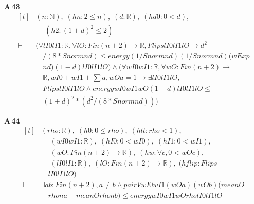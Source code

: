 \noindent\textbf{A\,43}\quad{}
{\footnotesize\[ \begin{aligned}[t]
&(\mathit{n} : \mathbb{N} ),\; (\mathit{hn} : 2 \leq \mathit{n}),\; (\mathit{d} : \mathbb{R} ),\; (\mathit{hd0} : 0 < \mathit{d}),\\
&\quad \; (\mathit{h2} : (1+\mathit{d})^{2} \leq 2)\\
\vdash\;&(\forall \mathit{lI0} \mathit{lI1} : \mathbb{R} , \forall \mathit{lO} : \mathit{Fin} (\mathit{n}+2) \to \mathbb{R} , \mathit{Flips} \mathit{lI0} \mathit{lI1} \mathit{lO} \to \mathit{d}^{2}\\
&\quad /(8*\mathit{Snorm} \mathit{n} \mathit{d}) \leq \mathit{energy} (1/\mathit{Snorm} \mathit{n} \mathit{d}) (1/\mathit{Snorm} \mathit{n} \mathit{d}) (\mathit{wExp}\\
&\quad \mathit{n} \mathit{d}) (1-\mathit{d}) \mathit{lI0} \mathit{lI1} \mathit{lO}) \wedge (\forall \mathit{wI0} \mathit{wI1} : \mathbb{R} , \forall \mathit{wO} : \mathit{Fin} (\mathit{n}+2) \to\\
&\quad \mathbb{R} , \mathit{wI0} + \mathit{wI1} + \textstyle\sum \mathit{a}, \mathit{wO} \mathit{a} = 1 \to \exists \mathit{lI0} \mathit{lI1} \mathit{lO},\\
&\quad \mathit{Flips} \mathit{lI0} \mathit{lI1} \mathit{lO} \wedge \mathit{energy} \mathit{wI0} \mathit{wI1} \mathit{wO} (1-\mathit{d}) \mathit{lI0} \mathit{lI1} \mathit{lO} \leq\\
&\quad (1+\mathit{d})^{2}*(\mathit{d}^{2}/(8*\mathit{Snorm} \mathit{n} \mathit{d})))
\end{aligned} \]}

\noindent\textbf{A\,44}\quad{}
{\footnotesize\[ \begin{aligned}[t]
&(\mathit{rho} : \mathbb{R} ),\; (\mathit{h0} : 0 \leq \mathit{rho}),\; (\mathit{hlt} : \mathit{rho} < 1),\\
&\quad \; (\mathit{wI0} \mathit{wI1} : \mathbb{R} ),\; (\mathit{hI0} : 0 < \mathit{wI0}),\; (\mathit{hI1} : 0 < \mathit{wI1}),\\
&\quad \; (\mathit{wO} : \mathit{Fin} (\mathit{n}+2) \to \mathbb{R} ),\; (\mathit{hw} : \forall \mathit{c}, 0 < \mathit{wO} \mathit{c}),\\
&\quad \; (\mathit{lI0} \mathit{lI1} : \mathbb{R} ),\; (\mathit{lO} : \mathit{Fin} (\mathit{n}+2) \to \mathbb{R} ),\; (\mathit{hflip} : \mathit{Flips}\\
&\quad \mathit{lI0} \mathit{lI1} \mathit{lO})\\
\vdash\;&\exists \mathit{a} \mathit{b} : \mathit{Fin} (\mathit{n}+2), \mathit{a} \neq \mathit{b} \wedge \mathit{pairV} \mathit{wI0} \mathit{wI1} (\mathit{wO} \mathit{a}) (\mathit{wO} \mathit{b}) (\mathit{meanO}\\
&\quad \mathit{rho} \mathit{n} \mathit{a} - \mathit{meanO} \mathit{rho} \mathit{n} \mathit{b}) \leq \mathit{energy} \mathit{wI0} \mathit{wI1} \mathit{wO} \mathit{rho} \mathit{lI0} \mathit{lI1} \mathit{lO}
\end{aligned} \]}

